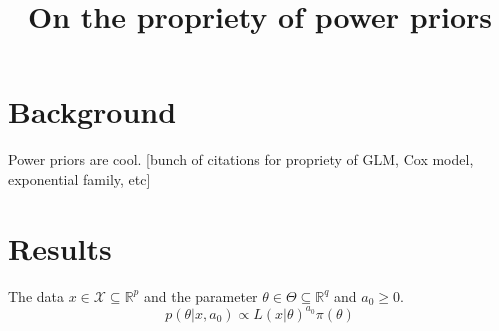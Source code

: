 \documentclass[a4paper, notitlepage, 11pt]{article}
\title{\vspace{-9ex}\centering \bf On the propriety of power priors}
\author{
}
\begin{document}
\maketitle

% 

\section*{Background}

Power priors are cool. [bunch of citations for propriety of GLM, Cox model, exponential family, etc]

\section*{Results}

The data $x \in \mathcal{X} \subseteq \mathbb{R}^p$  and the parameter $\theta \in \Theta \subseteq \mathbb{R}^q$ and $a_0 \geq 0$.
\begin{equation}
\label{eq:power_prior}
 p(\theta | x, a_0) \propto L(x | \theta)^{a_0}\pi(\theta)
\end{equation}
\end{document}
